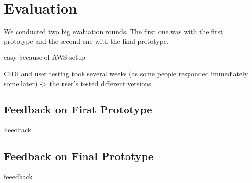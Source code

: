 \chapter{Evaluation}
We conducted two big evaluation rounds. The first one was with the first prototype and the second one with the final prototype. 

easy because of AWS setup

CIDI and user testing took several weeks (as some people responded immediately some later) -> the user's tested different versions

\section{Feedback on First Prototype}
Feedback

\section{Feedback on Final Prototype}
feeedback